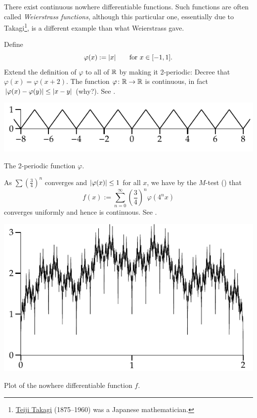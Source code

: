 \begin{example}
There exist continuous nowhere differentiable functions.
Such functions are often called
\emph{Weierstrass functions},
although this
particular one, essentially due to
Takagi\footnote{\href{https://en.wikipedia.org/wiki/Teiji_Takagi}{Teiji
Takagi} (1875--1960) was a Japanese mathematician.}, is a different example than what Weierstrass gave.

Define
\begin{equation*}
\varphi(x) :=\lvert {x} \rvert \qquad \text{for } x \in [-1,1] .
\end{equation*}
Extend the definition of $\varphi$ to all of ${\mathbb{R}}$ by making it
2-periodic:
Decree that
$\varphi(x) = \varphi(x+2)$.  The function $\varphi \colon {\mathbb{R}} \to {\mathbb{R}}$
is continuous, in fact $\lvert {\varphi(x)-\varphi(y)} \rvert \leq \lvert {x-y} \rvert$ (why?).
See .
\begin{myfigureht}
\includegraphics{figures/triangwave}
\caption{The 2-periodic function $\varphi$.\label{fig:triangwave}}
\end{myfigureht}

As $\sum {\left(\frac{3}{4}\right)}^n$ converges and $\lvert {\varphi(x)} \rvert \leq
1$ for all $x$, we have by the $M$-test
() that
\begin{equation*}
f(x) := \sum_{n=0}^\infty 
{\left(\frac{3}{4}\right)}^n \varphi(4^n x)
\end{equation*}
converges uniformly and hence is continuous.
See .

\begin{myfigureht}
\includegraphics{figures/nowherediff}
\caption{Plot of the nowhere differentiable function $f$.\label{fig:nowherediff}}
\end{myfigureht}


\end{example}
